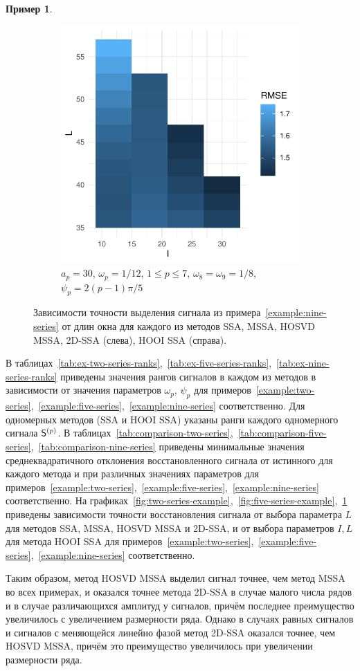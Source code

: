 \documentclass[specialist,
    substylefile = spbu_report.rtx,
    subf,href,colorlinks=true, 12pt]{disser}
\theoremstyle{plain}
\theoremstyle{definition}
\newtheorem{example}{Пример}[section]
\theoremstyle{remark}
\begin{document}
\begin{example}
\begin{figure}
\begin{subfigure}{.95\linewidth}
                \includegraphics[width=.34\linewidth]{nine-series-fourth_hooi}
                \caption{$a_p = 30$, $\omega_p=1/12$, $1 \leqslant p \leqslant 7$,
                    $\omega_8=\omega_9=1/8$, $\psi_p=2(p-1)\pi/5$}
            \end{subfigure}
            \caption{Зависимости точности выделения сигнала из примера~\ref{example:nine-series}
            от длин окна для каждого из методов
            SSA, MSSA, HOSVD MSSA, 2D-SSA (слева), HOOI SSA (справа).}
            \label{fig:nine-series-example}
        \end{figure}
    \end{example}

    В таблицах~\ref{tab:ex-two-series-ranks},~\ref{tab:ex-five-series-ranks},~\ref{tab:ex-nine-series-ranks}
    приведены значения рангов сигналов в каждом из методов в зависимости от значения параметров $\omega_p$, $\psi_p$
    для примеров~\ref{example:two-series},~\ref{example:five-series},~\ref{example:nine-series} соответственно.
    Для одномерных методов (SSA и HOOI SSA) указаны ранги каждого одномерного сигнала $\mathsf{S}^{(p)}$.
    В таблицах~\ref{tab:comparison-two-series},~\ref{tab:comparison-five-series},~\ref{tab:comparison-nine-series}
    приведены минимальные значения среднеквадратичного отклонения
    восстановленного сигнала от истинного для каждого метода и при различных значениях параметров для
    примеров~\ref{example:two-series},~\ref{example:five-series},~\ref{example:nine-series} соответственно.
    На графиках~\ref{fig:two-series-example},~\ref{fig:five-series-example},~\ref{fig:nine-series-example}
    приведены зависимости точности восстановления
    сигнала от выбора параметра $L$ для методов SSA, MSSA, HOSVD MSSA и 2D-SSA, и от
    выбора параметров $I, L$ для метода HOOI SSA для
    примеров~\ref{example:two-series},~\ref{example:five-series},~\ref{example:nine-series} соответственно.

    Таким образом, метод HOSVD MSSA выделил сигнал точнее, чем метод MSSA во всех примерах, и
    оказался точнее метода 2D-SSA в случае малого числа рядов и в случае различающихся
    амплитуд у сигналов, причём последнее преимущество увеличилось с увеличением размерности ряда.
    Однако в случаях равных сигналов и сигналов с меняющейся линейно фазой метод 2D-SSA оказался точнее,
    чем HOSVD MSSA, причём это преимущество увеличилось при увеличении размерности ряда.
\end{document}
